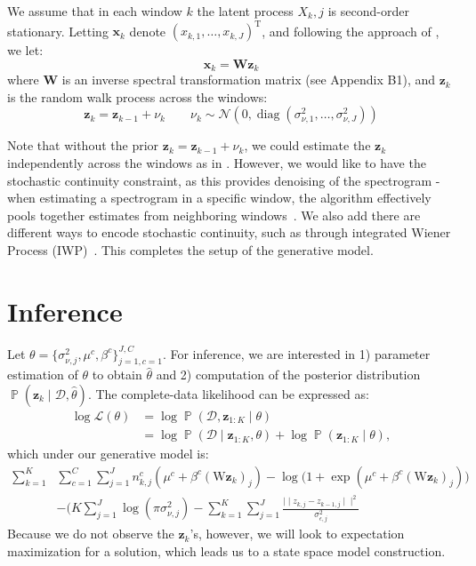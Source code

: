 \documentclass{article}
\DeclareMathOperator{\Pp}{\mathbb{P}}
\newcommand{\W}{\mathbf{W}}
\newcommand{\data}{\mathcal{D}}
\def\*#1{\mathbf{#1}}
\begin{document}
We assume that in each window $k$ the latent process $X_k,j$ is second-order
stationary. Letting $\*x_k$ denote $(x_{k,1}, \ldots, x_{k,J})^{\text{T}}$, and
following the approach of \cite{Kim2018}, we let: 
\begin{equation}
   \*x_k = \W \*z_k
\end{equation}
where $\W$ is an inverse spectral transformation matrix (see Appendix B1), and
$\*z_k$ is the random walk process across the windows:
\begin{equation}
   \*z_k = \*z_{k-1} + \nu_k \quad \quad \nu_k \sim \mathcal{N}(0, 
      \operatorname{diag}(\sigma_{\nu,1}^2,\ldots, \sigma_{\nu,J}^2))
\end{equation}

Note that without the prior $\*z_k = \*z_{k-1} + \nu_k$, we
could estimate the $\*z_k$ independently across the windows as in
\cite{Miran2017}. However, we would like to have the stochastic continuity
constraint, as this provides denoising of the spectrogram - when estimating a
spectrogram in a specific window, the algorithm effectively pools together
estimates from neighboring windows~\cite{Kim2018}. We also add there are
different ways to encode stochastic continuity, such as through integrated
Wiener Process (IWP)~\cite{Song18}. This completes the setup of the generative
model. 

\section{Inference}
Let $\theta = \{\sigma^2_{\nu,j}, \mu^c, \beta^c \}_{j=1,c=1}^{J,C}$. For
inference, we are interested in 1) parameter estimation of $\theta$ to obtain
$\widehat{\theta}$ and 2) computation of the posterior distribution $\Pp
(\*z_k\mid \data, \widehat{\theta})$. The complete-data likelihood can be
expressed as:
\begin{align}
   \log \mathcal{L}(\theta) &= \log \Pp(\data, \*z_{1:K} \mid \theta) \nonumber \\
   &= \log \Pp (\data \mid \*z_{1:K}, \theta) + \log \Pp(\*z_{1:K} \mid \theta),
\end{align}
which under our generative model is:
\begin{align}
      \sum_{k=1}^K & \sum_{c=1}^C \sum_{j=1}^J  n_{k,j}^c (\mu^c + \beta^c (\text{W}\*z_k)_j)
      - \log \big(1 + \exp( \mu^c + \beta^c (\text{W} \*z_k)_j) \big) \nonumber \\
   &-(K\sum_{j=1}^J\log(\pi \sigma^2_{\nu,j}) - \sum_{k=1}^K \sum_{j=1}^J \frac{\mid \mid z_{k,j}  - 
      z_{k-1,j} \mid \mid^2}{\sigma_{\epsilon, j}^2} 
\end{align}
Because we do not observe the $\*z_k$'s, however, we will look to
expectation maximization for a solution, which leads us to a state space model
construction. 
\end{document}
